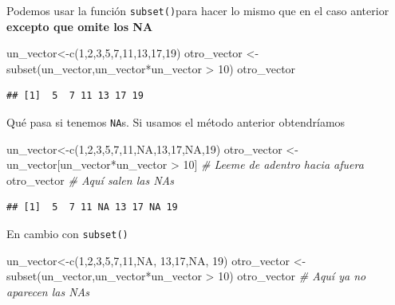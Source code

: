 \documentclass[
]{book}
\newenvironment{Shaded}{\begin{snugshade}}{\end{snugshade}}
\newcommand{\CommentTok}[1]{\textcolor[rgb]{0.56,0.35,0.01}{\textit{#1}}}
\newcommand{\ConstantTok}[1]{\textcolor[rgb]{0.00,0.00,0.00}{#1}}
\newcommand{\DecValTok}[1]{\textcolor[rgb]{0.00,0.00,0.81}{#1}}
\newcommand{\FunctionTok}[1]{\textcolor[rgb]{0.00,0.00,0.00}{#1}}
\newcommand{\NormalTok}[1]{#1}
\newcommand{\OtherTok}[1]{\textcolor[rgb]{0.56,0.35,0.01}{#1}}
\newcommand{\SpecialCharTok}[1]{\textcolor[rgb]{0.00,0.00,0.00}{#1}}
\begin{document}
Podemos usar la función \texttt{subset()}para hacer lo mismo que en el caso anterior \textbf{excepto que omite los NA}

\begin{Shaded}
\begin{Highlighting}[]
\NormalTok{un\_vector}\OtherTok{\textless{}{-}}\FunctionTok{c}\NormalTok{(}\DecValTok{1}\NormalTok{,}\DecValTok{2}\NormalTok{,}\DecValTok{3}\NormalTok{,}\DecValTok{5}\NormalTok{,}\DecValTok{7}\NormalTok{,}\DecValTok{11}\NormalTok{,}\DecValTok{13}\NormalTok{,}\DecValTok{17}\NormalTok{,}\DecValTok{19}\NormalTok{) }
\NormalTok{otro\_vector }\OtherTok{\textless{}{-}} \FunctionTok{subset}\NormalTok{(un\_vector,un\_vector}\SpecialCharTok{*}\NormalTok{un\_vector }\SpecialCharTok{\textgreater{}} \DecValTok{10}\NormalTok{)   }
\NormalTok{otro\_vector}
\end{Highlighting}
\end{Shaded}

\begin{verbatim}
## [1]  5  7 11 13 17 19
\end{verbatim}

Qué pasa si tenemos \texttt{NA}s. Si usamos el método anterior obtendríamos

\begin{Shaded}
\begin{Highlighting}[]
\NormalTok{un\_vector}\OtherTok{\textless{}{-}}\FunctionTok{c}\NormalTok{(}\DecValTok{1}\NormalTok{,}\DecValTok{2}\NormalTok{,}\DecValTok{3}\NormalTok{,}\DecValTok{5}\NormalTok{,}\DecValTok{7}\NormalTok{,}\DecValTok{11}\NormalTok{,}\ConstantTok{NA}\NormalTok{,}\DecValTok{13}\NormalTok{,}\DecValTok{17}\NormalTok{,}\ConstantTok{NA}\NormalTok{,}\DecValTok{19}\NormalTok{) }
\NormalTok{otro\_vector }\OtherTok{\textless{}{-}}\NormalTok{ un\_vector[un\_vector}\SpecialCharTok{*}\NormalTok{un\_vector }\SpecialCharTok{\textgreater{}} \DecValTok{10}\NormalTok{]   }\CommentTok{\# Leeme de adentro hacia afuera}
\NormalTok{otro\_vector  }\CommentTok{\# Aquí salen las NAs}
\end{Highlighting}
\end{Shaded}

\begin{verbatim}
## [1]  5  7 11 NA 13 17 NA 19
\end{verbatim}

En cambio con \texttt{subset()}

\begin{Shaded}
\begin{Highlighting}[]
\NormalTok{un\_vector}\OtherTok{\textless{}{-}}\FunctionTok{c}\NormalTok{(}\DecValTok{1}\NormalTok{,}\DecValTok{2}\NormalTok{,}\DecValTok{3}\NormalTok{,}\DecValTok{5}\NormalTok{,}\DecValTok{7}\NormalTok{,}\DecValTok{11}\NormalTok{,}\ConstantTok{NA}\NormalTok{, }\DecValTok{13}\NormalTok{,}\DecValTok{17}\NormalTok{,}\ConstantTok{NA}\NormalTok{, }\DecValTok{19}\NormalTok{) }
\NormalTok{otro\_vector }\OtherTok{\textless{}{-}} \FunctionTok{subset}\NormalTok{(un\_vector,un\_vector}\SpecialCharTok{*}\NormalTok{un\_vector }\SpecialCharTok{\textgreater{}} \DecValTok{10}\NormalTok{)   }
\NormalTok{otro\_vector  }\CommentTok{\# Aquí ya no aparecen las NAs}
\end{Highlighting}
\end{Shaded}
\end{document}
